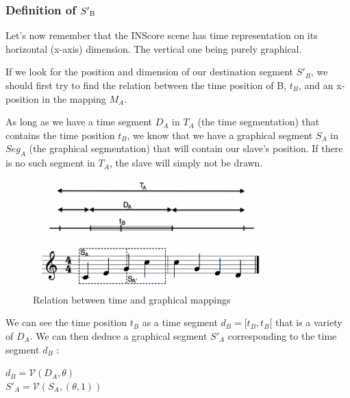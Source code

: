 \documentclass[a4paper]{article}
\newcommand{\variete}			{\ensuremath{\mathcal{V}}}
\begin{document}
\subsubsection{Definition of $S'\textsubscript{B}$}\label{subsubsec:defDestRect}


Let's now remember that the INScore scene has time representation on its horizontal (x-axis) dimension. The vertical one being purely graphical.

If we look for the position and dimension of our destination segment $S'_B$, we should first try to find the relation between the time position of B, $t_B$, and an x-position in the mapping $M_A$. 

As long as we have a time segment $D_A$ in $T_A$ (the time segmentation) that contains the time position $t_B$, we know that we have a graphical segment $S_A$ in $Seg_A$ (the graphical segmentation) that will contain our slave's position. If there is no such segment in $T_A$, the slave will simply not be drawn.

\begin{figure}[h]
\begin{center}
\includegraphics[width=9cm]{img/time_graphic4.png}
\caption{Relation between time and graphical mappings}
\label{fig:time2graphic}
\end{center}
\end{figure}

We can see the time position $t_B$ as a time segment $d_B = [t_B, t_B[$ that is a variety of $D_A$. We can then deduce a graphical segment $S'_A$ corresponding to the time segment $d_B$ :

\begin{center}
$d_B = \variete(D_A, \theta)$\\
$S'_A = \variete(S_A, (\theta, 1))$
\end{center}
\end{document}
